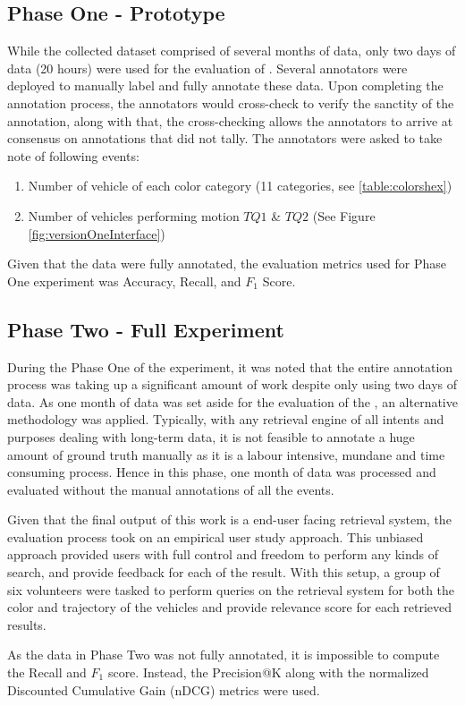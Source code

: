 \subsection{Phase One - Prototype}
While the collected dataset comprised of several months of data, only two days of data (20 hours) were used for the evaluation of \versionOneRet. Several annotators were deployed to manually label and fully annotate these data. Upon completing the annotation process, the annotators would cross-check to verify the sanctity of the annotation, along with that, the cross-checking allows the annotators to arrive at consensus on annotations that did not tally. The annotators were asked to take note of following events:
\begin{enumerate}
    \item Number of vehicle of each color category (11 categories, see \ref{table:colorshex})
    \item Number of vehicles performing motion $TQ1$ \& $TQ2$ (See Figure \ref{fig:versionOneInterface})
\end{enumerate}

Given that the data were fully annotated, the evaluation metrics used for Phase One experiment was Accuracy, Recall, and $F_1$ Score.

\subsection{Phase Two - Full Experiment}

During the Phase One of the experiment, it was noted that the entire annotation process was taking up a significant amount of work despite only using two days of data. As one month of data was set aside for the evaluation of the \versionTwoRet, an alternative methodology was applied. Typically, with any retrieval engine of all intents and purposes dealing with long-term data, it is not feasible to annotate a huge amount of ground truth manually as it is a labour intensive, mundane and time consuming process. Hence in this phase, one month of data was processed and evaluated without the manual annotations of all the events. 

Given that the final output of this work is a end-user facing retrieval system, the evaluation process took on an empirical user study approach. This unbiased approach provided users with full control and freedom to perform any kinds of search, and provide feedback for each of the result.
With this setup, a group of six volunteers were tasked to perform queries on the retrieval system for both the color and trajectory of the vehicles and provide relevance score for each retrieved results. 

As the data in Phase Two was not fully annotated, it is impossible to compute the Recall and $F_1$ score. Instead, the Precision@K along with the normalized Discounted Cumulative Gain (nDCG) metrics were used. 

